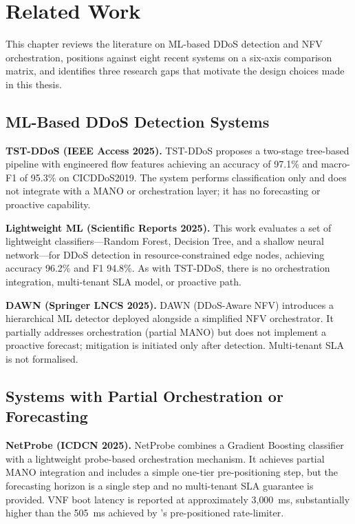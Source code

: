 \chapter{Related Work}
\label{ch:related}

This chapter reviews the literature on ML-based DDoS detection and
NFV orchestration, positions \padonap{} against eight recent systems
on a six-axis comparison matrix, and identifies three research gaps
that motivate the design choices made in this thesis.

\section{ML-Based DDoS Detection Systems}
\label{sec:related-ml}

\textbf{TST-DDoS (IEEE Access 2025).}
TST-DDoS proposes a two-stage tree-based pipeline with engineered
flow features achieving an accuracy of 97.1\% and macro-F1 of 95.3\%
on CICDDoS2019. The system performs classification only and does not
integrate with a MANO or orchestration layer; it has no forecasting
or proactive capability.

\textbf{Lightweight ML (Scientific Reports 2025).}
This work evaluates a set of lightweight classifiers---Random Forest,
Decision Tree, and a shallow neural network---for DDoS detection in
resource-constrained edge nodes, achieving accuracy 96.2\% and F1
94.8\%. As with TST-DDoS, there is no orchestration integration,
multi-tenant SLA model, or proactive path.

\textbf{DAWN (Springer LNCS 2025).}
DAWN (DDoS-Aware NFV) introduces a hierarchical ML detector deployed
alongside a simplified NFV orchestrator. It partially addresses
orchestration (partial MANO) but does not implement a proactive forecast;
mitigation is initiated only after detection. Multi-tenant SLA is not
formalised.

\section{Systems with Partial Orchestration or Forecasting}
\label{sec:related-orch}

\textbf{NetProbe (ICDCN 2025).}
NetProbe combines a Gradient Boosting classifier with a lightweight
probe-based orchestration mechanism. It achieves partial MANO
integration and includes a simple one-tier pre-positioning step,
but the forecasting horizon is a single step and no multi-tenant SLA
guarantee is provided. VNF boot latency is reported at approximately
3{,}000~ms, substantially higher than the 505~ms achieved by \padonap{}'s
pre-positioned rate-limiter.

